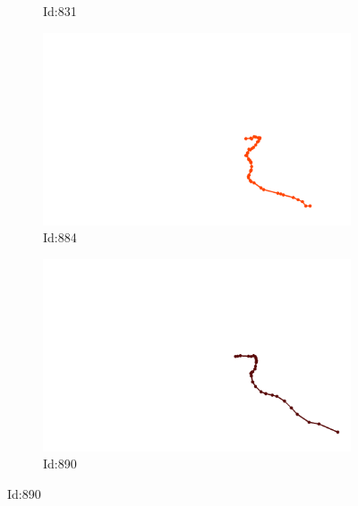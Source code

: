 \documentclass[12pt,twoside]{report}
\begin{document}
\begin{figure}
\begin{subfigure}[b]{0.20\textwidth}
\caption{Id:831}
\end{subfigure}
\begin{subfigure}[b]{0.20\textwidth}
\centering
\includegraphics[width=\textwidth]{../trajectories/884.png}
\caption{Id:884}
\end{subfigure}
\begin{subfigure}[b]{0.20\textwidth}
\centering
\includegraphics[width=\textwidth]{../trajectories/890.png}
\caption{Id:890}
\end{subfigure}
\end{figure}
\end{document}
